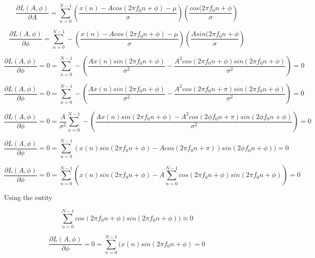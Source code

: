 \documentclass{report}
\begin{document}
\begin{equation}\label{key}
\frac{\partial L(A,\phi)}{\partial A} = \sum_{n=0}^{N-1} (\frac{x(n) - A cos (2\pi f_0 n + \phi)-\mu}{\sigma})(\frac{cos(2\pi f_0 n +\phi}{\sigma})
\end{equation}

\begin{equation}\label{key}
\frac{\partial L(A,\phi)}{\partial \phi} = \sum_{n=0}^{N-1} - (\frac{x(n) - A cos (2\pi f_0 n + \phi)-\mu}{\sigma})(\frac{Asin(2\pi f_0 n +\phi}{\sigma})
\end{equation}


\begin{equation}\label{key}
\frac{\partial L(A,\phi)}{\partial \phi} = 0 = \sum_{n=0}^{N-1} - (\frac{Ax(n)sin(2\pi f_0 n +\phi)}{\sigma^2}-\frac{A^2cos(2\pi f_0 n +\phi)sin(2\pi f_0 n +\phi)}{\sigma^2}) = 0
\end{equation}


\begin{equation}\label{key}
\frac{\partial L(A,\phi)}{\partial \phi} = 0 = \sum_{n=0}^{N-1} - (\frac{Ax(n)sin(2\pi f_0 n +\phi)}{\sigma^2}-\frac{A^2cos(2\pi f_0 n +\pi)sin(2\pi f_0 n +\phi)}{\sigma^2}) = 0
\end{equation}

\begin{equation}\label{key}
\frac{\partial L(A,\phi)}{\partial \phi} = 0 = \frac{A}{\sigma^2} \sum_{n=0}^{N-1} - (\frac{Ax(n)sin(2\pi f_0 n +\phi)-A^2cos(2\phi f_0 n +\pi)sin(2\phi f_0 n +\phi)}{\sigma^2}) = 0
\end{equation}


\begin{equation}\label{key}
\frac{\partial L(A,\phi)}{\partial \phi} = 0 = \sum_{n=0}^{N-1}(x(n)sin(2\pi f_0 n +\phi) - Acos(2\pi f_0 n +\pi))sin(2\phi f_0 n +\phi)) = 0
\end{equation}


\begin{equation}\label{key}
\frac{\partial L(A,\phi)}{\partial \phi} = 0 = \sum_{n=0}^{N-1}(x(n)sin(2\pi f_0 n +\phi) - A\sum_{n=0}^{N-1}cos(2\pi f_0 n +\phi)sin(2\pi f_0 n +\phi)) = 0
\end{equation}

Using the entity 

\begin{equation}\label{entitycossin}
\sum_{n=0}^{N-1}cos(2\pi f_0 n +\phi)sin(2\pi f_0 n +\phi)) \approx 0
\end{equation}

\begin{equation}\label{key}
\frac{\partial L(A,\phi)}{\partial \phi} = 0 = \sum_{n=0}^{N-1}(x(n)sin(2\pi f_0 n +\phi) = 0
\end{equation}
\end{document}
